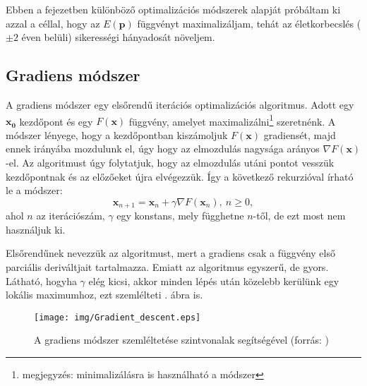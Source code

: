 \documentclass[12pt]{article}
\begin{document}
Ebben a fejezetben különböző optimalizációs módszerek alapját próbáltam ki azzal a céllal, hogy az $E(\mathbf{p})$ függvényt maximalizáljam, tehát az életkorbecslés ($\pm 2$ éven belüli) sikerességi hányadosát növeljem.
\subsection{Gradiens módszer}
A gradiens módszer \cite{gradient1, gradient2} egy elsőrendű iterációs optimalizációs algoritmus. Adott egy $\mathbf{x_0}$ kezdőpont és egy $F(\mathbf{x})$ függvény, amelyet maximalizálni\footnote{megjegyzés: minimalizálásra is használható a módszer} szeretnénk. A módszer lényege, hogy a kezdőpontban kiszámoljuk $F(\mathbf{x})$ gradiensét, majd ennek irányába mozdulunk el, úgy hogy az elmozdulás nagysága arányos $\nabla F(\mathbf{x})$-el.
Az algoritmust úgy folytatjuk, hogy az elmozdulás utáni pontot vesszük kezdőpontnak és az előzőeket újra elvégezzük.
Így a következő rekurzióval írható le a módszer:
\begin{equation}
	\mathbf {x}_{n+1}=\mathbf {x}_{n}+\gamma\nabla F(\mathbf {x}_{n}),\ n\geq 0,
\end{equation}
ahol $n$ az iterációszám, $\gamma$ egy konstans, mely függhetne $n$-től, de ezt most nem használjuk ki. 

Elsőrendűnek nevezzük az algoritmust, mert a gradiens csak a függvény első parciális deriváltjait tartalmazza. Emiatt az algoritmus egyszerű, de gyors. Látható, hogyha $\gamma$ elég kicsi, akkor minden lépés után közelebb kerülünk egy lokális maximumhoz, ezt szemlélteti . ábra is.
\begin{figure}[H]
	\centering
	\texttt{[image: img/Gradient\_descent.eps]}
	\caption{A gradiens módszer szemléltetése szintvonalak segítségével (forrás: \cite{grad_wiki})}
	\label{grad_contour}
\end{figure}
\end{document}

